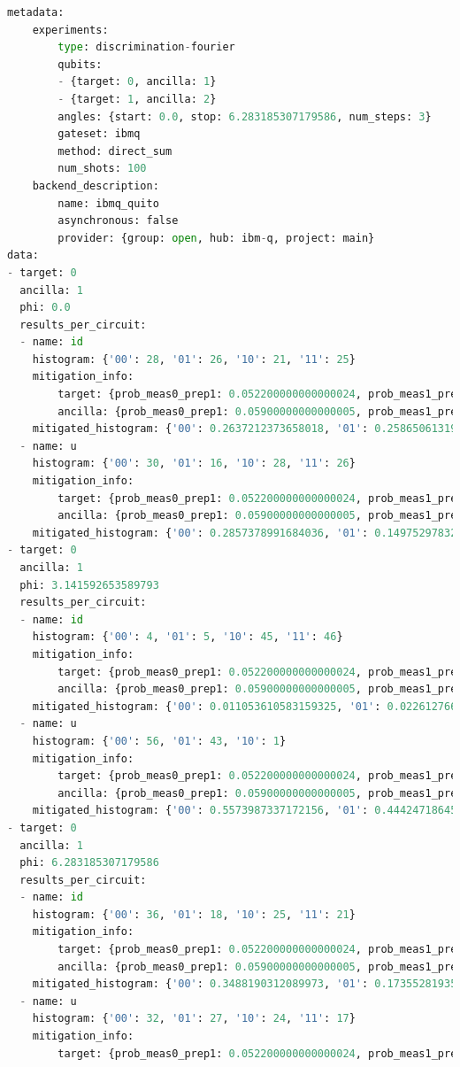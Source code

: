 \documentclass[preprint,12pt, a4paper, dvipsnames]{elsarticle}
\newcommand{\1}{{\rm 1\hspace{-0.9mm}l}}
\theoremstyle{definition}
\begin{document}
\begin{lstlisting}[language=Python, caption=Results (synchronous)]
metadata:
	experiments:
		type: discrimination-fourier
		qubits:
		- {target: 0, ancilla: 1}
		- {target: 1, ancilla: 2}
		angles: {start: 0.0, stop: 6.283185307179586, num_steps: 3}
		gateset: ibmq
		method: direct_sum
		num_shots: 100
	backend_description:
		name: ibmq_quito
		asynchronous: false
		provider: {group: open, hub: ibm-q, project: main}
data:
- target: 0
  ancilla: 1
  phi: 0.0
  results_per_circuit:
  - name: id
	histogram: {'00': 28, '01': 26, '10': 21, '11': 25}
	mitigation_info:
		target: {prob_meas0_prep1: 0.052200000000000024, prob_meas1_prep0: 0.0172}
		ancilla: {prob_meas0_prep1: 0.05900000000000005, prob_meas1_prep0: 0.0202}
	mitigated_histogram: {'00': 0.2637212373658018, '01': 0.25865061319892463, '10': 0.2067279352110304, '11': 0.2709002142242433}
  - name: u
	histogram: {'00': 30, '01': 16, '10': 28, '11': 26}
	mitigation_info:
		target: {prob_meas0_prep1: 0.052200000000000024, prob_meas1_prep0: 0.0172}
		ancilla: {prob_meas0_prep1: 0.05900000000000005, prob_meas1_prep0: 0.0202}
	mitigated_histogram: {'00': 0.2857378991684036, '01': 0.14975297832942433, '10': 0.28142307224788693, '11': 0.2830860502542851}
- target: 0
  ancilla: 1
  phi: 3.141592653589793
  results_per_circuit:
  - name: id
	histogram: {'00': 4, '01': 5, '10': 45, '11': 46}
	mitigation_info:
		target: {prob_meas0_prep1: 0.052200000000000024, prob_meas1_prep0: 0.0172}
		ancilla: {prob_meas0_prep1: 0.05900000000000005, prob_meas1_prep0: 0.0202}
	mitigated_histogram: {'00': 0.011053610583159325, '01': 0.02261276648026373, '10': 0.4593955619936729, '11': 0.5069380609429042}
  - name: u
	histogram: {'00': 56, '01': 43, '10': 1}
	mitigation_info:
		target: {prob_meas0_prep1: 0.052200000000000024, prob_meas1_prep0: 0.0172}
		ancilla: {prob_meas0_prep1: 0.05900000000000005, prob_meas1_prep0: 0.0202}
	mitigated_histogram: {'00': 0.5573987337172156, '01': 0.44424718645642625, '10': -0.0016459201736417181}
- target: 0
  ancilla: 1
  phi: 6.283185307179586
  results_per_circuit:
  - name: id
	histogram: {'00': 36, '01': 18, '10': 25, '11': 21}
	mitigation_info:
		target: {prob_meas0_prep1: 0.052200000000000024, prob_meas1_prep0: 0.0172}
		ancilla: {prob_meas0_prep1: 0.05900000000000005, prob_meas1_prep0: 0.0202}
	mitigated_histogram: {'00': 0.3488190312089973, '01': 0.17355281935572894, '10': 0.2505792064871127, '11': 0.22704894294816103}
  - name: u
	histogram: {'00': 32, '01': 27, '10': 24, '11': 17}
	mitigation_info:
		target: {prob_meas0_prep1: 0.052200000000000024, prob_meas1_prep0: 0.0172}

\end{lstlisting}
\end{document}

